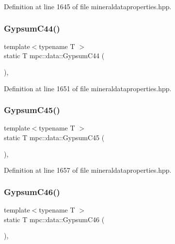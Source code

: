 Definition at line 1645 of file mineraldataproperties.\+hpp.

\mbox{\label{namespacempc_1_1data_ac2e8cd21f63133e4f28600baa0432bad}} 
\subsubsection{\texorpdfstring{Gypsum\+C44()}{GypsumC44()}}
{\footnotesize\ttfamily template$<$typename T $>$ \\
static T mpc\+::data\+::\+Gypsum\+C44 (\begin{DoxyParamCaption}{ }\end{DoxyParamCaption})\hspace{0.3cm}{\ttfamily [inline]}, {\ttfamily [static]}}



Definition at line 1651 of file mineraldataproperties.\+hpp.

\mbox{\label{namespacempc_1_1data_a7ef38f03377325d2807d507ab337f0bd}} 
\subsubsection{\texorpdfstring{Gypsum\+C45()}{GypsumC45()}}
{\footnotesize\ttfamily template$<$typename T $>$ \\
static T mpc\+::data\+::\+Gypsum\+C45 (\begin{DoxyParamCaption}{ }\end{DoxyParamCaption})\hspace{0.3cm}{\ttfamily [inline]}, {\ttfamily [static]}}



Definition at line 1657 of file mineraldataproperties.\+hpp.

\mbox{\label{namespacempc_1_1data_a6d5ff15e0397a0c2894602d0ddf08417}} 
\subsubsection{\texorpdfstring{Gypsum\+C46()}{GypsumC46()}}
{\footnotesize\ttfamily template$<$typename T $>$ \\
static T mpc\+::data\+::\+Gypsum\+C46 (\begin{DoxyParamCaption}{ }\end{DoxyParamCaption})\hspace{0.3cm}{\ttfamily [inline]}, {\ttfamily [static]}}



